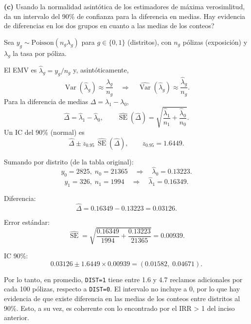 
\begin{myblock}
    
    \textbf{(c)} Usando la normalidad asintótica de los estimadores de máxima verosimlitud, da un 
     intervalo del 90\% de confianza para la diferencia en medias. Hay evidencia de diferencias en los
     dos grupos en cuanto a las medias de los conteos?
\end{myblock}

Sea $y_g \sim \text{Poisson}(n_g\lambda_g)$ para $g \in \{0,1\}$ (distritos), con $n_g$ pólizas (exposición) y $\lambda_g$ la tasa por póliza.

El EMV es $\hat{\lambda}_g = y_g/n_g$ y, asintóticamente,
\[
    \operatorname{Var}(\hat{\lambda}_g) \approx \frac{\lambda_g}{n_g} \quad \Rightarrow \quad \widehat{\operatorname{Var}}(\hat{\lambda}_g) \approx \frac{\hat{\lambda}_g}{n_g}.
\]
Para la diferencia de medias $\Delta = \lambda_1 - \lambda_0$,
\[
    \hat{\Delta} = \hat{\lambda}_1 - \hat{\lambda}_0, \qquad \widehat{\operatorname{SE}}(\hat{\Delta}) = \sqrt{\frac{\hat{\lambda}_1}{n_1} + \frac{\hat{\lambda}_0}{n_0}}.
\]
Un IC del 90\% (normal) es
\[
    \hat{\Delta} \pm z_{0.95}\,\widehat{\operatorname{SE}}(\hat{\Delta}), \qquad z_{0.95} = 1.6449.
\]

Sumando por distrito (de la tabla original):
\[
    y_0=2825, \; n_0=21365 \quad \Rightarrow \quad \hat{\lambda}_0=0.13223.
\]
\[
    y_1=326, \; n_1=1994 \quad \Rightarrow \quad \hat{\lambda}_1=0.16349.
\]

Diferencia:
\[
    \hat{\Delta} = 0.16349 - 0.13223 = 0.03126.
\]

Error estándar:
\[
    \widehat{\operatorname{SE}} = \sqrt{\frac{0.16349}{1994} + \frac{0.13223}{21365}} = 0.00939.
\]

IC 90\%:
\[
    0.03126 \pm 1.6449 \times 0.00939 = (0.01582, \; 0.04671).
\]

Por lo tanto, en promedio, \texttt{DIST=1} tiene entre 1.6 y 4.7 reclamos adicionales por cada 100 pólizas,
respecto a \texttt{DIST=0}. El intervalo no incluye a 0, por lo que hay evidencia de que existe diferencia
en las medias de los conteos entre distritos al 90\%. Esto, a su vez, es coherente con lo encontrado
por el IRR > 1 del inciso anterior. 







